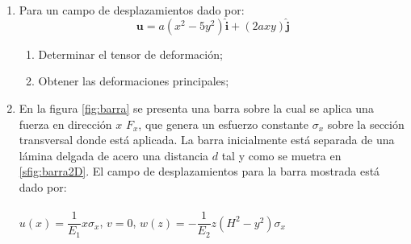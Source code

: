 \documentclass[../notas medios.tex]{subfiles}
\begin{document}
\begin{enumerate}
\begin{figure}[H]
	\centering
	\texttt{[image: Viga.pdf]} 
	\caption{Viga de Longitud $= L$, Altura $=H$ y Espesor $=t$. El origen del sistema coordenado coincidiendo con el centroide de la barra.}
	\label{def:Mario}
\end{figure}

\begin{enumerate}
%
	\item Explique a que acciones externas está sometida la barra
	\item Dibuje la configuracio\'on deformada de la barra
	\item \textquestiondown Hay partículas sometidas a rotaciones de cuerpo rigido? (responda s\'i o no y justifique su respuesta).
	\item \textquestiondown Hay partículas que {\textbf{NO}} experimenten distorsiones angulares? (responda si o no y justifique su respuesta).
	\item En que coordenadas está la part\'icula que sufre mayor deformaci\'on axial y cu\'al es el valor de esta deformaci\'on.
	\item En que coordenadas est\'a la part\'icula que sufre mayor distorsi\'on angular y cu\'al es el valor de esta deformaci\'on.
	\item Encuentre los desplazamientos y deformaciones del punto de coordenadas $\left( 0,0,0 \right)$.
%
\end{enumerate}
%
\item   \label{punto11_d} Para un campo de desplazamientos dado por:
\[\mathbf{u} = a(x^2 - 5y^2)\hat{\mathbf{i}} + (2ax y)\hat{\mathbf{j}} \]

\begin{enumerate}
\item Determinar el tensor de deformaci\'on;
\item Obtener las deformaciones principales;
\end{enumerate}

\newpage

\item \label{punto12_d} En la figura \cref{fig:barra} se presenta una barra sobre la cual se aplica una fuerza en dirección $x$ $F_{x}$, que genera  un esfuerzo constante $\sigma_x$ sobre la sección transversal donde está aplicada. La barra inicialmente está  separada de una lámina delgada de acero una distancia $d$ tal y como se muetra en \cref{sfig:barra2D}. El campo de desplazamientos para la barra mostrada está dado por:\\\\
%
\hspace*{20mm} $u\left( x \right) = \dfrac{1}{E_1}  x \sigma_x$, \hspace*{10mm} $v=0$, \hspace*{10mm} $w\left( z \right) = - \dfrac{1}{E_2}  z (H^2 - y^2) \sigma_x$ \\


\end{enumerate}
\end{document}
